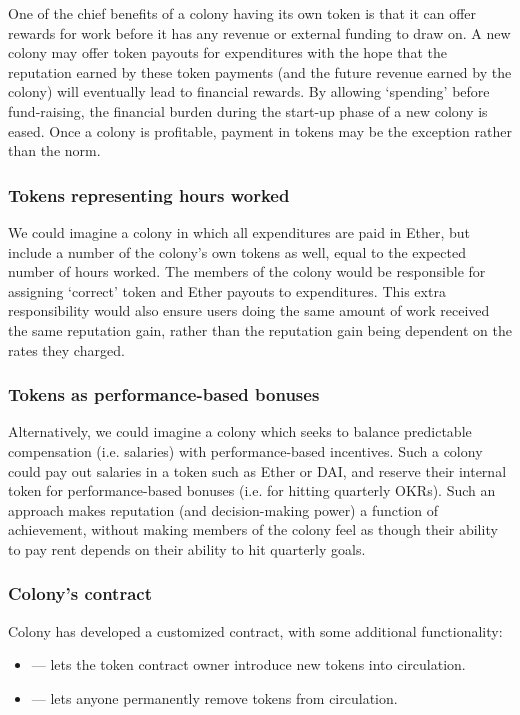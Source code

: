 One of the chief benefits of a colony having its own token is that it can offer rewards for work before it has any revenue or external funding to draw on. A new colony may offer token payouts for expenditures with the hope that the reputation earned by these token payments (and the future revenue earned by the colony) will eventually lead to financial rewards. By allowing `spending' before fund-raising, the financial burden during the start-up phase of a new colony is eased. Once a colony is profitable, payment in tokens may be the exception rather than the norm.

\subsubsection*{Tokens representing hours worked}

We could imagine a colony in which all expenditures are paid in Ether, but include a number of the colony's own tokens as well, equal to the expected number of hours worked. The members of the colony would be responsible for assigning `correct' token and Ether payouts to expenditures. This extra responsibility would also ensure users doing the same amount of work received the same reputation gain, rather than the reputation gain being dependent on the rates they charged.

\subsubsection*{Tokens as performance-based bonuses}

Alternatively, we could imagine a colony which seeks to balance predictable compensation (i.e. salaries) with performance-based incentives. Such a colony could pay out salaries in a token such as Ether or DAI, and reserve their internal token for performance-based bonuses (i.e. for hitting quarterly OKRs). Such an approach makes reputation (and decision-making power) a function of achievement, without making members of the colony feel as though their ability to pay rent depends on their ability to hit quarterly goals.

\subsubsection{Colony's  contract}

Colony has developed a customized  contract, with some additional functionality:

\begin{itemize}
	\item {} --- lets the token contract owner introduce new tokens into circulation.
	\item {} --- lets anyone permanently remove tokens from circulation.
\end{itemize}

